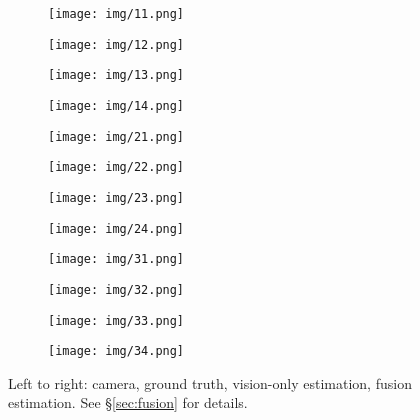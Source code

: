 \documentclass[10pt,twocolumn,letterpaper]{article}
\begin{document}
\begin{figure}
    \centering
    \begin{subfigure}[b]{0.11\textwidth}
        \centering
        \texttt{[image: img/11.png]}
    \end{subfigure}
   \begin{subfigure}[b]{0.11\textwidth}
   \centering
        \texttt{[image: img/12.png]}
    \end{subfigure}
    \begin{subfigure}[b]{0.11\textwidth}
    \centering
        \texttt{[image: img/13.png]}
    \end{subfigure}
    \begin{subfigure}[b]{0.11\textwidth}
    \centering
        \texttt{[image: img/14.png]}
    \end{subfigure}
    \centering
    \begin{subfigure}[b]{0.11\textwidth}
        \centering
        \texttt{[image: img/21.png]}
    \end{subfigure}
   \begin{subfigure}[b]{0.11\textwidth}
   \centering
        \texttt{[image: img/22.png]}
    \end{subfigure}
    \begin{subfigure}[b]{0.11\textwidth}
    \centering
        \texttt{[image: img/23.png]}
    \end{subfigure}
    \begin{subfigure}[b]{0.11\textwidth}
    \centering
        \texttt{[image: img/24.png]}
    \end{subfigure}
    \centering
    \begin{subfigure}[b]{0.11\textwidth}
        \centering
        \texttt{[image: img/31.png]}
    \end{subfigure}
   \begin{subfigure}[b]{0.11\textwidth}
   \centering
        \texttt{[image: img/32.png]}
    \end{subfigure}
    \begin{subfigure}[b]{0.11\textwidth}
    \centering
        \texttt{[image: img/33.png]}
    \end{subfigure}
    \begin{subfigure}[b]{0.11\textwidth}
    \centering
        \texttt{[image: img/34.png]}
    \end{subfigure}
\caption{Left to right: camera, ground truth, vision-only estimation, fusion estimation. See \S\ref{sec:fusion} for details.}
\label{fig:qual}
    \vspace*{-8pt}
\end{figure}
\end{document}
